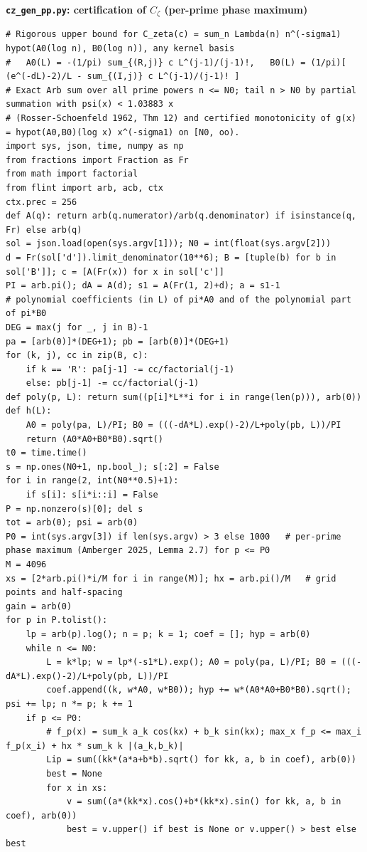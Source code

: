 \documentclass[11pt,reqno]{amsart}
\numberwithin{equation}{section}
\theoremstyle{definition}
\theoremstyle{remark}
\newcommand{\appsub}[1]{\par\medskip\noindent\textbf{#1}\par\nobreak\smallskip}
\begin{document}
\appsub{\texttt{cz\_gen\_pp.py}: certification of $C_\zeta$ (per-prime phase maximum)}
\label{app:cert_cz}
\begin{lstlisting}
# Rigorous upper bound for C_zeta(c) = sum_n Lambda(n) n^(-sigma1) hypot(A0(log n), B0(log n)), any kernel basis
#   A0(L) = -(1/pi) sum_{(R,j)} c L^(j-1)/(j-1)!,   B0(L) = (1/pi)[ (e^(-dL)-2)/L - sum_{(I,j)} c L^(j-1)/(j-1)! ]
# Exact Arb sum over all prime powers n <= N0; tail n > N0 by partial summation with psi(x) < 1.03883 x
# (Rosser-Schoenfeld 1962, Thm 12) and certified monotonicity of g(x) = hypot(A0,B0)(log x) x^(-sigma1) on [N0, oo).
import sys, json, time, numpy as np
from fractions import Fraction as Fr
from math import factorial
from flint import arb, acb, ctx
ctx.prec = 256
def A(q): return arb(q.numerator)/arb(q.denominator) if isinstance(q, Fr) else arb(q)
sol = json.load(open(sys.argv[1])); N0 = int(float(sys.argv[2]))
d = Fr(sol['d']).limit_denominator(10**6); B = [tuple(b) for b in sol['B']]; c = [A(Fr(x)) for x in sol['c']]
PI = arb.pi(); dA = A(d); s1 = A(Fr(1, 2)+d); a = s1-1
# polynomial coefficients (in L) of pi*A0 and of the polynomial part of pi*B0
DEG = max(j for _, j in B)-1
pa = [arb(0)]*(DEG+1); pb = [arb(0)]*(DEG+1)
for (k, j), cc in zip(B, c):
    if k == 'R': pa[j-1] -= cc/factorial(j-1)
    else: pb[j-1] -= cc/factorial(j-1)
def poly(p, L): return sum((p[i]*L**i for i in range(len(p))), arb(0))
def h(L):
    A0 = poly(pa, L)/PI; B0 = (((-dA*L).exp()-2)/L+poly(pb, L))/PI
    return (A0*A0+B0*B0).sqrt()
t0 = time.time()
s = np.ones(N0+1, np.bool_); s[:2] = False
for i in range(2, int(N0**0.5)+1):
    if s[i]: s[i*i::i] = False
P = np.nonzero(s)[0]; del s
tot = arb(0); psi = arb(0)
P0 = int(sys.argv[3]) if len(sys.argv) > 3 else 1000   # per-prime phase maximum (Amberger 2025, Lemma 2.7) for p <= P0
M = 4096
xs = [2*arb.pi()*i/M for i in range(M)]; hx = arb.pi()/M   # grid points and half-spacing
gain = arb(0)
for p in P.tolist():
    lp = arb(p).log(); n = p; k = 1; coef = []; hyp = arb(0)
    while n <= N0:
        L = k*lp; w = lp*(-s1*L).exp(); A0 = poly(pa, L)/PI; B0 = (((-dA*L).exp()-2)/L+poly(pb, L))/PI
        coef.append((k, w*A0, w*B0)); hyp += w*(A0*A0+B0*B0).sqrt(); psi += lp; n *= p; k += 1
    if p <= P0:
        # f_p(x) = sum_k a_k cos(kx) + b_k sin(kx); max_x f_p <= max_i f_p(x_i) + hx * sum_k k |(a_k,b_k)|
        Lip = sum((kk*(a*a+b*b).sqrt() for kk, a, b in coef), arb(0))
        best = None
        for x in xs:
            v = sum((a*(kk*x).cos()+b*(kk*x).sin() for kk, a, b in coef), arb(0))
            best = v.upper() if best is None or v.upper() > best else best

\end{lstlisting}
\end{document}
